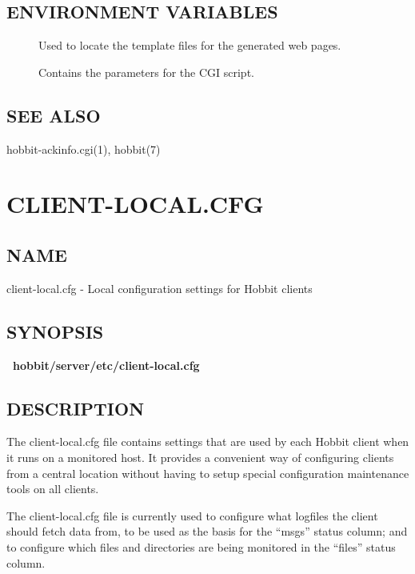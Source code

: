 \subsection{ENVIRONMENT VARIABLES}
\begin{description}
\item[] Used to locate the template files for the generated web pages. 

 

\item[] Contains the parameters for the CGI script. 

 


\end{description}
\subsection{SEE ALSO}
hobbit-ackinfo.cgi(1), hobbit(7) 

  
%
\newpage
\section{CLIENT-LOCAL.CFG}
\subsection{NAME}
 client-local.cfg - Local configuration settings for Hobbit clients 

 
\subsection{SYNOPSIS}
\textbf{~hobbit/server/etc/client-local.cfg}


 
\subsection{DESCRIPTION}
 The client-local.cfg file contains settings that are used by each
 Hobbit client when it runs on a monitored host. It provides a
 convenient way of configuring clients from a central location without
 having to setup special configuration maintenance tools on all
 clients. 


  The client-local.cfg file is currently used to configure what logfiles the client should fetch data from, to be used as the basis for the ``msgs'' status column; and to configure which files and directories are being monitored in the ``files'' status column. 


